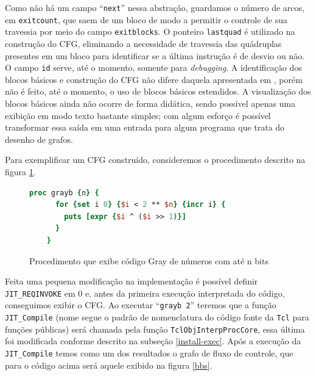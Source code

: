 Como não há um campo ``\verb!next!'' nessa abstração, guardamos o
número de arcos, em \verb!exitcount!, que saem de um bloco de modo a
permitir o controle de sua travessia por meio do campo
\verb!exitblocks!. O ponteiro \verb!lastquad! é
utilizado na construção do CFG, eliminando a necessidade de travessia das
quádruplas presentes em um bloco para identificar se a última
instrução é de desvio ou não. O campo \verb!id! serve, até o momento,
somente para \textit{debugging}. A identificação dos blocos básicos e
construção do CFG não difere daquela apresentada em
, porém não é feito, até o momento, o
uso de blocos básicos estendidos. A visualização dos blocos básicos
ainda não ocorre de forma didática, sendo possível apenas uma exibição
em modo texto bastante simples; com algum esforço é possível
transformar essa saída em uma entrada para algum programa que trata do
desenho de grafos.

Para exemplificar um CFG construído, consideremos o procedimento
descrito na figura \ref{fig:gray}.
\begin{figure}[h]
  \centering
  \begin{lstlisting}[language=Tcl]
    proc grayb {n} {
      for {set i 0} {$i < 2 ** $n} {incr i} {
        puts [expr {$i ^ ($i >> 1)}]
      }
    }
  \end{lstlisting}
  \caption{Procedimento que exibe código Gray de números com até n
    bits \label{fig:gray}}
\end{figure}
Feita uma pequena modificação na implementação é possível definir
\verb!JIT_REQINVOKE! em 0 e, antes da primeira execução interpretada do
código, conseguimos exibir o CFG. Ao executar ``\verb!grayb 2!''
teremos que a função \verb!JIT_Compile! (nome segue o padrão de
nomenclatura do código fonte da \texttt{Tcl} para funções públicas)
será chamada pela função
\verb!TclObjInterpProcCore!, essa última foi modificada conforme
descrito na subseção \ref{install-exec}. Após a execução da
\verb!JIT_Compile! temos como um dos resultados o grafo de fluxo de
controle, que para o código acima será aquele exibido na figura \ref{bbs}.

